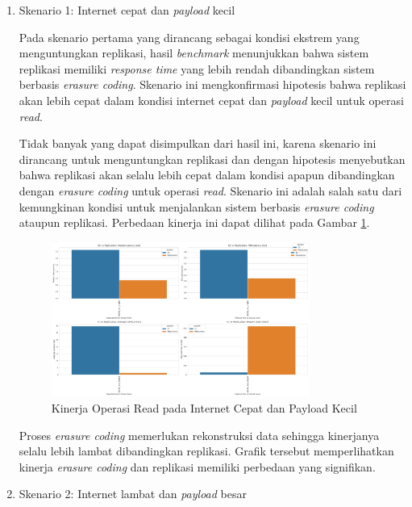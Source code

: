\begin{enumerate}
  \item Skenario 1: Internet cepat dan \textit{payload} kecil
  
  Pada skenario pertama yang dirancang sebagai kondisi ekstrem yang menguntungkan replikasi, hasil \textit{benchmark} menunjukkan bahwa sistem replikasi memiliki \textit{response time} yang lebih rendah dibandingkan sistem berbasis \textit{erasure coding}. Skenario ini mengkonfirmasi hipotesis bahwa replikasi akan lebih cepat dalam kondisi internet cepat dan \textit{payload} kecil untuk operasi \textit{read}.
  
  Tidak banyak yang dapat disimpulkan dari hasil ini, karena skenario ini dirancang untuk menguntungkan replikasi dan dengan hipotesis menyebutkan bahwa replikasi akan selalu lebih cepat dalam kondisi apapun dibandingkan dengan \textit{erasure coding} untuk operasi \textit{read}. Skenario ini adalah salah satu dari kemungkinan kondisi untuk menjalankan sistem berbasis \textit{erasure coding} ataupun replikasi. Perbedaan kinerja ini dapat dilihat pada Gambar \ref{fig:read-smload-fastnet}.

  \begin{figure}[ht]
    \centering
    \includegraphics[width=0.8\textwidth]{resources/chapter-4/read_smload_fastnet.png}

    \caption{Kinerja Operasi Read pada Internet Cepat dan Payload Kecil}
    \label{fig:read-smload-fastnet}
  \end{figure}

  Proses \textit{erasure coding} memerlukan rekonstruksi data sehingga kinerjanya selalu lebih lambat dibandingkan replikasi. Grafik tersebut memperlihatkan kinerja \textit{erasure coding} dan replikasi memiliki perbedaan yang signifikan.

  \item Skenario 2: Internet lambat dan \textit{payload} besar
  

\end{enumerate}
